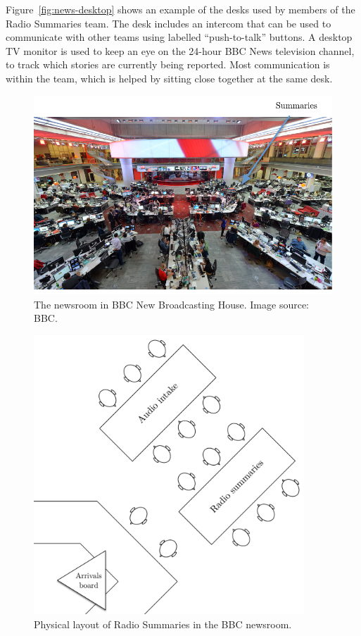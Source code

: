 Figure~\ref{fig:news-desktop} shows an example of the desks used by members of the Radio Summaries team. The desk
includes an intercom that can be used to communicate with other teams using labelled ``push-to-talk'' buttons. A
desktop TV monitor is used to keep an eye on the 24-hour BBC News television channel, to track which stories are
currently being reported. Most communication is within the team, which is helped by sitting close together at the same
desk.

\begin{figure}[p]
  \centering
  \includegraphics[width=\columnwidth]{figs/newsroom.pdf}
  \caption{The newsroom in BBC New Broadcasting House. Image source: BBC.}
  \label{fig:newsroom}
\end{figure}

\begin{figure}[p]
	\centering
	\includegraphics[width=4in]{figs/news-layout.pdf}
  \caption{Physical layout of Radio Summaries in the BBC newsroom.}
	\label{fig:newsroom-layout}
\end{figure}

